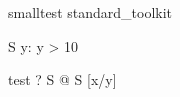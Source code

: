 \begin{zsection}
\SECTION smalltest \parents standard\_toolkit
\end{zsection}

\begin{schema}{S}
   y: \nat
\where
   y > 10
\end{schema}

\begin{theorem}{test}
   \vdash? \forall S @ \theta S [x/y]
\end{theorem}
